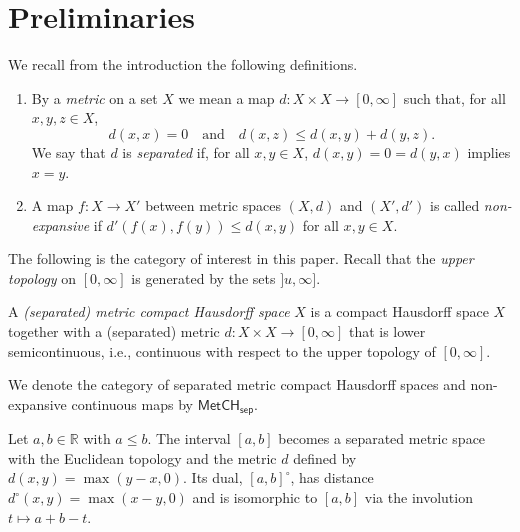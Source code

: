 \documentclass[11pt]{amsart}
\theoremstyle{definition}
\newcommand{\cat}[1]{\mathsf{#1}}
\newcommand{\MetCHsep}{\cat{MetCH_{sep}}}
\newcommand{\R}{\mathbb{R}}
\begin{document}
\section{Preliminaries}
\label{sec:preliminaries}


We recall from the introduction the following definitions.

\begin{definition} \hfill
	\begin{enumerate}

		\item
		By a \emph{metric} on a set $X$ we mean a map \(d \colon X\times X\to [0,\infty]\) such that, for all \(x,y,z\in X\),
  \begin{displaymath}
    d(x,x)=0
    \quad\text{and}\quad
    d(x,z)\leq d(x,y)+d(y,z).
  \end{displaymath}
  We say that \(d\) is \emph{separated} if, for all \(x,y\in X\), \(d(x,y)=0=d(y,x)\) implies \(x=y\).

  	\item
	A map $f \colon X\to X'$ between metric spaces $(X,d)$ and $(X',d')$ is called \emph{non-expansive} if $d'(f(x),f(y))\leq d(x,y)$ for all $x,y\in X$.

	\end{enumerate}
\end{definition}

  The following is the category of interest in this paper. Recall that the \emph{upper topology} on \([0,\infty]\) is generated by the sets \(]u,\infty]\).
\begin{definition}[\cite{HR18}]
  \label{d:def:1}
  A \emph{(separated) metric compact Hausdorff space} \(X\) is a compact Hausdorff space \(X\) together with a (separated) metric  $d \colon X \times X \to [0,\infty]$ that is lower semicontinuous, i.e., continuous with respect to the upper topology of $[0,\infty]$.

	We denote the category of separated metric compact Hausdorff spaces and non-expansive continuous maps by \(\MetCHsep\).
\end{definition}

\begin{example}\label{d:ex:1}
  Let $a,b \in \R$ with $a \leq b$. The interval \([a,b]\) becomes a separated metric space with the Euclidean topology and the metric \(d\) defined by $d(x,y) = \max(y-x, 0)$.
  Its dual, \([a,b]^{\circ}\), has distance $d^{\circ}(x,y) = \max(x-y, 0)$ and is isomorphic to \([a,b]\) via the involution \(t\mapsto a+b-t\).
\end{example}
\end{document}
